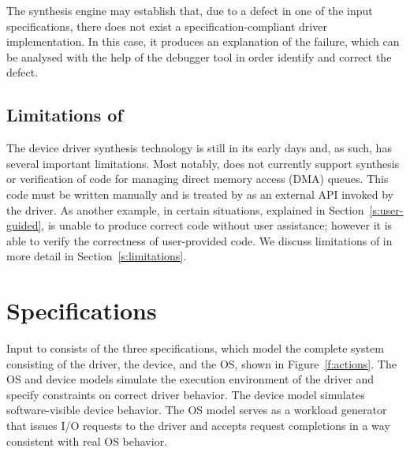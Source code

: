 The synthesis engine may establish that, due to a defect in one of the input specifications, there does not exist a specification-compliant driver implementation.  In this case, it produces an explanation of the failure, which can be analysed with the help of the \termite debugger tool in order identify and correct the defect.

        
%
%        
%        

\subsection{Limitations of \termite}  The device driver synthesis technology is still in its early days and, as such, has several important limitations.  Most notably, \termite does not currently support synthesis or verification of code for managing direct memory access (DMA) queues.  This code must be written manually and is treated by \termite as an external API invoked by the driver.  As another example, in certain situations, explained in Section~\ref{s:user-guided}, \termite is unable to produce correct code without user assistance; however it is able to verify the correctness of user-provided code.  We discuss limitations of \termite in more detail in Section~\ref{s:limitations}.

\section{Specifications}

\label{s:specifications}

Input to \termite consists of the three specifications, which model the complete system consisting of the driver, the device, and the OS, shown in Figure~\ref{f:actions}.  The OS and device models simulate the execution environment of the driver and specify constraints on correct driver behavior.  The device model simulates software-visible device behavior.  The OS model serves as a workload generator that issues I/O requests to the driver and accepts request completions in a way consistent with real OS behavior.

